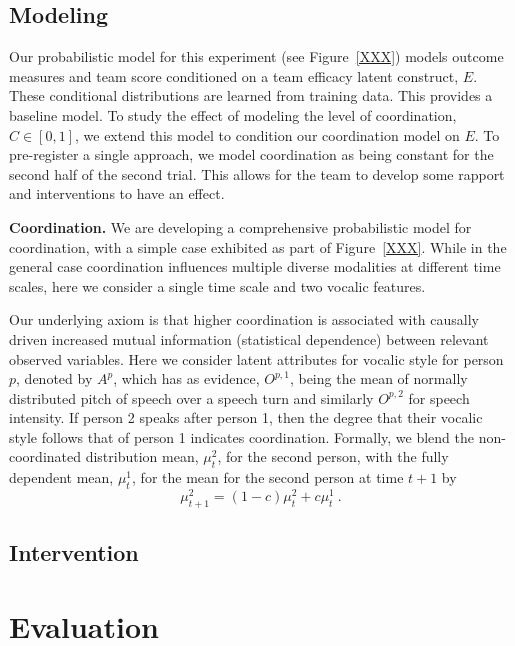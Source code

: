 \subsection{Modeling}
    Our probabilistic model for this experiment (see  Figure~\ref{XXX}) models outcome measures and
    team score conditioned on a team efficacy latent construct, $E$. These
    conditional distributions are learned from training data. This provides a
    baseline model. To study the effect of modeling the level of coordination,
    $C\in[0,1]$, we
    extend this model to condition our coordination model on 
    $E$. To pre-register a single approach, we model coordination as being
    constant for the second half of the second
    trial. This allows for the team to develop some rapport and interventions to
    have an effect. 

    \textbf{Coordination.} We are developing a comprehensive probabilistic model for
    coordination, with a simple case exhibited as part of Figure~\ref{XXX}.
    While in the general case coordination influences multiple diverse
    modalities at different time scales, here we consider a single time scale
    and two vocalic features. 

    Our underlying axiom is that higher coordination is associated with causally
    driven increased mutual information (statistical dependence) between
    relevant observed variables. Here we consider latent attributes for vocalic
    style for person $p$, denoted by $A^{p}$, which has as evidence, $O^{p,1}$,
    being the mean of normally distributed pitch of speech over a speech turn
    and similarly $O^{p,2}$ for speech intensity. If person 2 speaks after
    person 1, then the degree that their vocalic style follows that of person 1
    indicates coordination. Formally, we blend the non-coordinated distribution
    mean, $\mu^2_t$, for the second person, with the fully dependent mean,
    $\mu^1_t$, for the mean for the second person at time $t+1$ by
    \begin{equation}
    \mu^2_{t+1} = (1-c) \mu^2_t + c\mu^1_t ~.
    \end{equation}

\subsection{Intervention}





\section{Evaluation}

